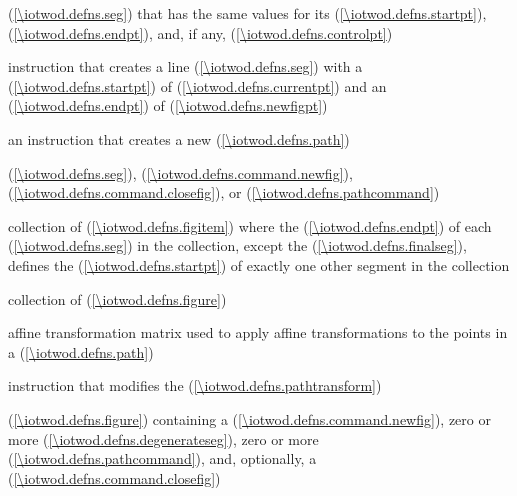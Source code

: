 %
 (\ref{\iotwod.defns.seg}) that has the same values for its  (\ref{\iotwod.defns.startpt}),  (\ref{\iotwod.defns.endpt}), and, if any,  (\ref{\iotwod.defns.controlpt})

%
 instruction that creates a line  (\ref{\iotwod.defns.seg}) with a  (\ref{\iotwod.defns.startpt}) of  (\ref{\iotwod.defns.currentpt}) and an  (\ref{\iotwod.defns.endpt}) of  (\ref{\iotwod.defns.newfigpt})

%
 an instruction that creates a new  (\ref{\iotwod.defns.path})

%
 (\ref{\iotwod.defns.seg}),  (\ref{\iotwod.defns.command.newfig}),  (\ref{\iotwod.defns.command.closefig}), or  (\ref{\iotwod.defns.pathcommand})

%
collection of  (\ref{\iotwod.defns.figitem}) where the  (\ref{\iotwod.defns.endpt}) of each  (\ref{\iotwod.defns.seg}) in the collection, except the  (\ref{\iotwod.defns.finalseg}), defines the  (\ref{\iotwod.defns.startpt}) of exactly one other segment in the collection

%
collection of  (\ref{\iotwod.defns.figure})

%
affine transformation matrix used to apply affine transformations to the points in a  (\ref{\iotwod.defns.path})

%
instruction that modifies the  (\ref{\iotwod.defns.pathtransform})

%
 (\ref{\iotwod.defns.figure}) containing a  (\ref{\iotwod.defns.command.newfig}), zero or more  (\ref{\iotwod.defns.degenerateseg}), zero or more  (\ref{\iotwod.defns.pathcommand}), and, optionally, a  (\ref{\iotwod.defns.command.closefig})

